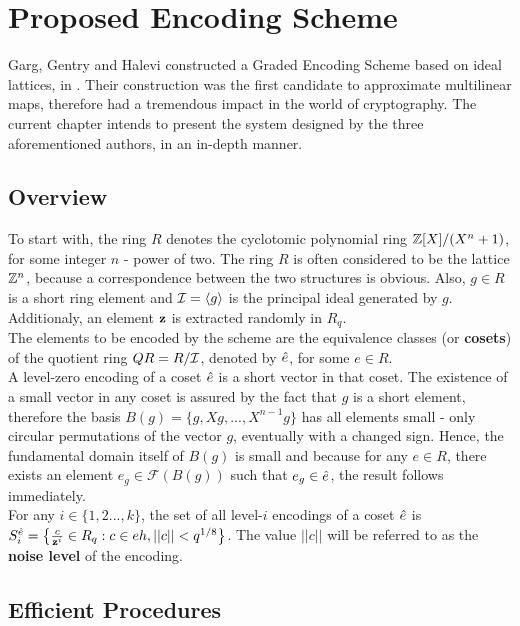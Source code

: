 \chapter{Proposed Encoding Scheme}

Garg, Gentry and Halevi constructed a Graded Encoding Scheme based on ideal lattices, in \cite{GGH13}. Their construction was the first candidate to approximate multilinear maps, therefore had a tremendous impact in the world of cryptography. The current chapter intends to present the system designed by the three aforementioned authors, in an in-depth manner. 

\section{Overview}

To start with, the ring $R$ denotes the cyclotomic polynomial ring ${\mathbb Z}[X]/(X^n +1)$, for some integer $n$ - power of two. The ring $R$ is often considered to be the lattice ${\mathbb Z}^n$, because a correspondence between the two structures is obvious. Also, $g \in R$ is a short ring element and $\mathcal{I} = \langle g \rangle$ is the principal ideal generated by $g$. Additionaly, an element $\textbf{z}$ is extracted randomly in $R_q$. \\

The elements to be encoded by the scheme are the equivalence classes (or \textbf{cosets}) of the quotient ring $QR = R / \mathcal{I}$, denoted by $\hat{e}$, for some $e \in R$. \\

A level-zero encoding of a coset $\hat{e}$ is a short vector in that coset. The existence of a small vector in any coset is assured by the fact that $g$ is a short element, therefore the basis $B(g) = \{g, Xg,...,X^{n-1}g\}$ has all elements small - only circular permutations of the vector $g$, eventually with a changed sign. Hence, the fundamental domain itself of $B(g)$ is small and because for any $e \in R$, there exists an element $e_g \in \mathcal{F}(B(g))$ such that $e_g \in \hat{e}$, the result follows immediately.\\

For any $i \in \{1,2...,k\}$, the set of all level-$i$ encodings of a coset $\hat{e}$ is $S_i^{\hat{e}} = \big\{ \frac{c}{\textbf{z}^i}\in R_q : c \in eh, ||c|| < q^{1/8}\big\}$. The value $||c||$ will be referred to as the \textbf{noise level} of the encoding.\\

\section{Efficient Procedures}

